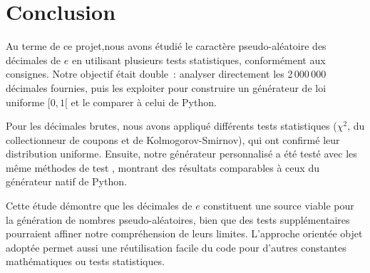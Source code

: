 \section*{Conclusion}


Au terme de ce projet,nous avons étudié le caractère pseudo-aléatoire des décimales de $e$ en utilisant plusieurs tests statistiques, conformément aux consignes. Notre objectif était double~: analyser directement les 2\,000\,000 décimales fournies, puis les exploiter pour construire un générateur de loi uniforme $[0,1[$ et le comparer à celui de Python.

Pour les décimales brutes, nous avons appliqué différents tests statistiques ($\chi^2$, du collectionneur de coupons et de Kolmogorov-Smirnov), qui ont confirmé leur distribution uniforme. Ensuite, notre générateur personnalisé a été testé avec les même méthodes de test , montrant des résultats comparables à ceux du générateur natif de Python.

Cette étude démontre que les décimales de $e$ constituent une source viable pour la génération de nombres pseudo-aléatoires, bien que des tests supplémentaires pourraient affiner notre compréhension de leurs limites. L'approche orientée objet adoptée permet aussi une réutilisation facile du code pour d'autres constantes mathématiques ou tests statistiques.


\clearpage